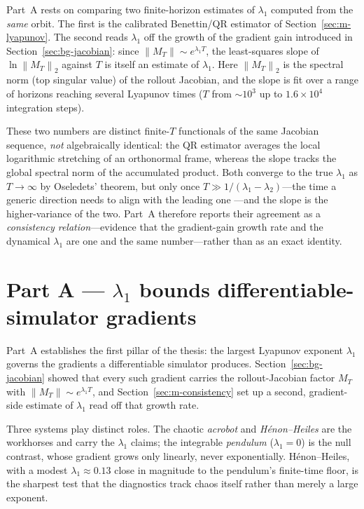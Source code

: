 \documentclass[11pt]{article}
\newcommand{\norm}[1]{\left\lVert #1 \right\rVert}
\begin{document}
Part~A rests on comparing two finite-horizon estimates of $\lambda_1$ computed from the \emph{same}
orbit. The
first is the calibrated Benettin/QR estimator of Section~\ref{sec:m-lyapunov}. The second reads
$\lambda_1$ off the growth of the gradient gain introduced in Section~\ref{sec:bg-jacobian}: since
$\norm{M_T}\sim e^{\lambda_1 T}$, the least-squares slope of $\ln\norm{M_T}_2$ against $T$ is itself
an estimate of $\lambda_1$. Here $\norm{M_T}_2$ is the spectral norm (top singular value) of the
rollout Jacobian, and the slope is fit over a range of horizons reaching several Lyapunov times
($T$ from $\sim\!10^3$ up to $1.6\times10^4$ integration steps).

These two numbers are distinct finite-$T$ functionals of the same Jacobian sequence, \emph{not}
algebraically identical: the QR estimator averages the local logarithmic stretching of an
orthonormal frame, whereas the slope tracks the global spectral norm of the accumulated product.
Both converge to the true $\lambda_1$ as $T\to\infty$ by Oseledets' theorem, but only once
$T \gg 1/(\lambda_1-\lambda_2)$---the time a generic direction needs to align with the leading one
---and the slope is the higher-variance of the two. Part~A therefore reports their agreement as a
\emph{consistency relation}---evidence that the gradient-gain growth rate and the dynamical
$\lambda_1$ are one and the same number---rather than as an exact identity.

\section{Part A --- \texorpdfstring{$\lambda_1$}{lambda1} bounds differentiable-simulator gradients}\label{sec:partA}
Part~A establishes the first pillar of the thesis: the largest Lyapunov exponent $\lambda_1$ governs
the gradients a differentiable simulator produces. Section~\ref{sec:bg-jacobian} showed that every
such gradient carries the rollout-Jacobian factor $M_T$ with $\norm{M_T}\sim e^{\lambda_1 T}$, and
Section~\ref{sec:m-consistency} set up a second, gradient-side estimate of $\lambda_1$ read off that
growth rate.

Three systems play distinct roles. The chaotic \emph{acrobot} and \emph{Hénon--Heiles} are the
workhorses and carry the $\lambda_1$ claims; the integrable \emph{pendulum} ($\lambda_1=0$) is the null
contrast, whose gradient grows only linearly, never exponentially. Hénon--Heiles, with a modest
$\lambda_1\approx0.13$ close in magnitude to the pendulum's finite-time floor, is the sharpest test that
the diagnostics track chaos itself rather than merely a large exponent.
\end{document}
